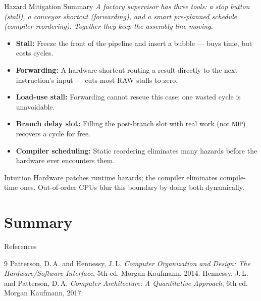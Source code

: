 \documentclass{beamer}
\begin{document}
\begin{frame}{Hazard Mitigation Summary}
  \textit{A factory supervisor has three tools: a stop button (stall), a
  conveyor shortcut (forwarding), and a smart pre-planned schedule (compiler
  reordering). Together they keep the assembly line moving.}

  \smallskip
  \begin{itemize}
    \item \textbf{Stall:} Freeze the front of the pipeline and insert a bubble
          --- buys time, but costs cycles.
    \item \textbf{Forwarding:} A hardware shortcut routing a result directly to
          the next instruction's input --- cuts most RAW stalls to zero.
    \item \textbf{Load-use stall:} Forwarding cannot rescue this case; one
          wasted cycle is unavoidable.
    \item \textbf{Branch delay slot:} Filling the post-branch slot with real
          work (not \texttt{NOP}) recovers a cycle for free.
    \item \textbf{Compiler scheduling:} Static reordering eliminates many
          hazards before the hardware ever encounters them.
  \end{itemize}

  \begin{block}{Intuition}
    \small Hardware patches runtime hazards; the compiler eliminates
    compile-time ones. Out-of-order CPUs blur this boundary by doing both
    dynamically.
  \end{block}
\end{frame}

\section{Summary}

\begin{frame}{References}
  \begin{thebibliography}{9}
     Patterson, D.\,A. and Hennessy, J.\,L.
      \textit{Computer Organization and Design: The Hardware/Software Interface},
      5th ed. Morgan Kaufmann, 2014.
     Hennessy, J.\,L. and Patterson, D.\,A.
      \textit{Computer Architecture: A Quantitative Approach},
      6th ed. Morgan Kaufmann, 2017.
  \end{thebibliography}
\end{frame}
\end{document}
